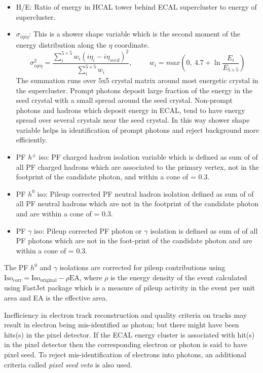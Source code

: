 \begin{itemize}
\item H/E: Ratio of energy in HCAL tower behind ECAL supercluster to energy of supercluster.
\item $\sigma_{i\eta i\eta}$: This is a shower shape variable which is the second moment of the energy distribution along the $\eta$ coordinate.
\begin{equation}
\sigma_{i\eta i\eta}^2 = \frac{\sum\limits_{i}^{5\times5}w_i(i\eta_i-i\eta_{seed})^2}{\sum\limits_{i}^{5\times5}w_i}, \hspace{1cm}
w_i = max(0,\ 4.7+\ln\frac{E_i}{E_{5\times5}})
\end{equation}
The summation runs over 5x5 crystal matrix around most energetic crystal in the supercluster. Prompt photons deposit large fraction
of the energy in the seed crystal with a small spread around the seed crystal. Non-prompt photons and hadrons which deposit energy in 
ECAL, tend to have energy spread over several crystals near the seed crystal. In this way shower shape variable helps in identification of
prompt photons and reject background more efficiently.
\item PF $h^\pm$ iso: PF charged hadron isolation variable which is defined as sum of \pt of all PF charged hadrons which are
associated to the primary vertex, not in the footprint of the candidate photon, and within a cone of \dR = 0.3.
\item PF $h^0$ iso: Pileup corrected PF neutral hadron isolation defined as sum of \et of all PF neutral hadrons which are not in the 
footprint of the candidate photon and are within a cone of \dR = 0.3.
\item PF $\gamma$ iso: Pileup corrected PF photon or $\gamma$ isolation is defined as sum of \et of all PF photons which are not in the 
foot-print of
the candidate photon and are within a cone of \dR = 0.3.
\end{itemize}
The PF $h^0$ and $\gamma$ isolations are corrected for pileup contributions using $\mathrm{Iso}_{\mathrm{corr}} = 
\mathrm{Iso}_{\mathrm{original}} - \rho\mathrm{EA}$, where $\rho$ is the energy density of the event calculated using FastJet package 
\cite{Cacciari:2011ma} which is a measure of pileup activity in the event per unit area and EA is the effective area.

Inefficiency in electron track reconstruction and quality criteria on tracks may result in electron being mis-identified as photon; 
but there might have been hits(s) in the pixel detector. If the ECAL energy cluster is associated with hit(s) in the pixel detector then 
the corresponding electron or photon is said to have pixel seed. To reject mis-identification of electrons into photons, an additional 
criteria called \textit{pixel seed veto} is also used. 

